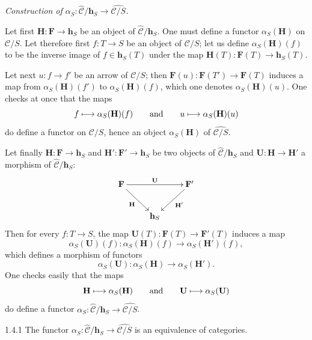 \begin{enumeratei}
\item \emph{Construction of
\(\alpha_{S}\colon\widehat{\mathcal{C}}/\mathbf{h}_{S}
\to\widehat{\mathcal{C}/S}\).}

Let first \(\mathbf{H}\colon\mathbf{F}\to\mathbf{h}_{S}\) be an object of
\(\widehat{\mathcal{C}}/\mathbf{h}_{S}\). One must define a functor
\(\alpha_{S}(\mathbf{H})\) on \(\mathcal{C}/S\). Let therefore first
\(f\colon T\to S\) be an object of \(\mathcal{C}/S\); let us define
\(\alpha_{S}(\mathbf{H})(f)\) to be the inverse image of
\(f\in\mathbf{h}_{S}(T)\) under the map
\(\mathbf{H}(T)\colon\mathbf{F}(T)\to\mathbf{h}_{S}(T)\).%
{\renewcommand{\thefootnote}{(10)}}

Let next \(u\colon f\to f'\) be an arrow of \(\mathcal{C}/S\); then
\(\mathbf{F}(u)\colon\mathbf{F}(T')\to\mathbf{F}(T)\) induces a map from
\(\alpha_{S}(\mathbf{H})(f')\) to \(\alpha_{S}(\mathbf{H})(f)\), which one
denotes \(\alpha_{S}(\mathbf{H})(u)\). One checks at once that the maps
\[
f\longmapsto\alpha_{S}(\mathbf{H})(f)
\qquad\text{and}\qquad
u\longmapsto\alpha_{S}(\mathbf{H})(u)
\]
do define a functor on \(\mathcal{C}/S\), hence an object
\(\alpha_{S}(\mathbf{H})\) of \(\widehat{\mathcal{C}/S}\).

Let finally \(\mathbf{H}\colon\mathbf{F}\to\mathbf{h}_{S}\) and
\(\mathbf{H}'\colon\mathbf{F}'\to\mathbf{h}_{S}\) be two objects of
\(\widehat{\mathcal{C}}/\mathbf{h}_{S}\) and
\(\mathbf{U}\colon\mathbf{H}\to\mathbf{H}'\) a morphism of
\(\widehat{\mathcal{C}}/\mathbf{h}_{S}\):
\[
\xymatrix{
\mathbf{F}\ar[rr]^-{\mathbf{U}}\ar[rd]_-{\mathbf{H}}
& & \mathbf{F}'\ar[ld]^-{\mathbf{H}'}\\
& \mathbf{h}_{S} &
}
\]
Then for every \(f\colon T\to S\), the map
\(\mathbf{U}(T)\colon\mathbf{F}(T)\to\mathbf{F}'(T)\) induces a map
\[
\alpha_{S}(\mathbf{U})(f)\colon
\alpha_{S}(\mathbf{H})(f)\to\alpha_{S}(\mathbf{H}')(f),
\]
which defines a morphism of functors
\[
\alpha_{S}(\mathbf{U})\colon
\alpha_{S}(\mathbf{H})\to\alpha_{S}(\mathbf{H}').
\]
One checks easily that the maps
\[
\mathbf{H}\longmapsto\alpha_{S}(\mathbf{H})
\qquad\text{and}\qquad
\mathbf{U}\longmapsto\alpha_{S}(\mathbf{U})
\]
do define a functor
\(\alpha_{S}\colon\widehat{\mathcal{C}}/\mathbf{h}_{S}
\to\widehat{\mathcal{C}/S}\).

\item
\begin{proposition}{1.4.1}
\label{I.1.4.1}
The functor
\(\alpha_{S}\colon\widehat{\mathcal{C}}/\mathbf{h}_{S}
\to\widehat{\mathcal{C}/S}\)
is an equivalence of categories.
\end{proposition}
\end{enumeratei}

